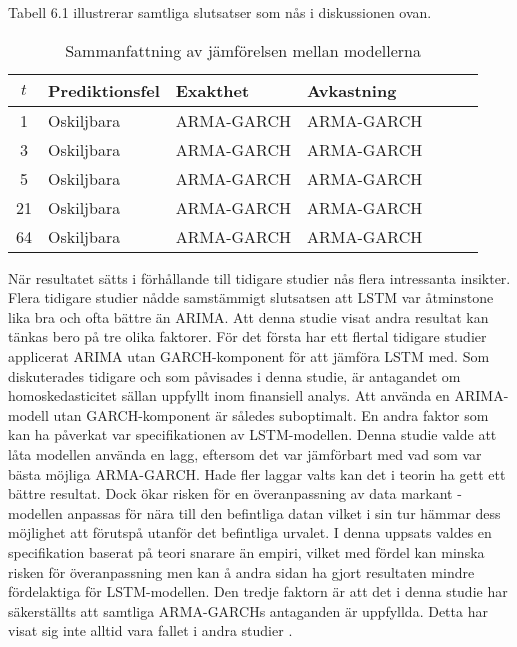 \documentclass[11pt]{article}
\numberwithin{equation}{section}
\numberwithin{table}{section}
\numberwithin{figure}{section}
\begin{document}
Tabell 6.1 illustrerar samtliga slutsatser som nås i diskussionen ovan.


\begin{table}[H]
\caption{Sammanfattning av jämförelsen mellan modellerna}

\begin{tabularx}{\textwidth}{c *{6}{Y}}
\toprule
$t$  & Prediktionsfel & Exakthet & Avkastning \\
\hline

1      & Oskiljbara          & ARMA-GARCH                 & ARMA-GARCH          \\
3      & Oskiljbara          & ARMA-GARCH          & ARMA-GARCH    \\

5      & Oskiljbara          & ARMA-GARCH         &ARMA-GARCH   \\

21     &  Oskiljbara         & ARMA-GARCH         & ARMA-GARCH   \\


64     & Oskiljbara         & ARMA-GARCH         & ARMA-GARCH    \\ 

\bottomrule
\end{tabularx}
\end{table}

När resultatet sätts i förhållande till tidigare studier nås flera intressanta insikter. Flera tidigare studier nådde samstämmigt slutsatsen att LSTM var åtminstone lika bra och ofta bättre än ARIMA. Att denna studie visat andra resultat kan tänkas bero på tre olika faktorer. För det första har ett flertal tidigare studier applicerat ARIMA utan GARCH-komponent för att jämföra LSTM med. Som diskuterades tidigare och som påvisades i denna studie, är antagandet om homoskedasticitet sällan uppfyllt inom finansiell analys. Att använda en ARIMA-modell utan GARCH-komponent är således suboptimalt. En andra faktor som kan ha påverkat var specifikationen av LSTM-modellen. Denna studie valde att låta modellen använda en lagg, eftersom det var jämförbart med vad som var bästa möjliga ARMA-GARCH. Hade fler laggar valts kan det i teorin ha gett ett bättre resultat. Dock ökar risken för en överanpassning av data markant -  modellen anpassas för nära till den befintliga datan vilket i sin tur hämmar dess möjlighet att förutspå utanför det befintliga urvalet. I denna uppsats valdes en specifikation baserat på teori snarare än empiri, vilket med fördel kan minska risken för överanpassning men kan å andra sidan ha gjort resultaten mindre fördelaktiga för LSTM-modellen. Den tredje faktorn är att det i denna studie har säkerställts att samtliga ARMA-GARCHs antaganden är uppfyllda. Detta har visat sig inte alltid vara fallet i andra studier \parencite{paliwal2009neural}. 
\end{document}
